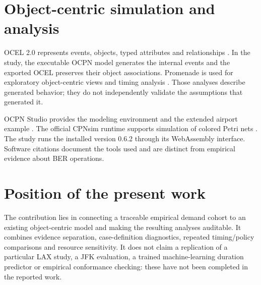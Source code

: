 \section{Object-centric simulation and analysis}
OCEL 2.0 represents events, objects, typed attributes and relationships \cite{ocel2}. In the study, the executable OCPN model generates the internal events and the exported OCEL preserves their object associations. Promenade is used for exploratory object-centric views and timing analysis \cite{promenade}. Those analyses describe generated behavior; they do not independently validate the assumptions that generated it.

OCPN Studio provides the modeling environment and the extended airport example \cite{ocpn_studio}. The official CPNsim runtime supports simulation of colored Petri nets \cite{cpnsim}. The study runs the installed version 0.6.2 through its WebAssembly interface. Software citations document the tools used and are distinct from empirical evidence about BER operations.

\section{Position of the present work}
The contribution lies in connecting a traceable empirical demand cohort to an existing object-centric model and making the resulting analyses auditable. It combines evidence separation, case-definition diagnostics, repeated timing/policy comparisons and resource sensitivity. It does not claim a replication of a particular LAX study, a JFK evaluation, a trained machine-learning duration predictor or empirical conformance checking: these have not been completed in the reported work.
